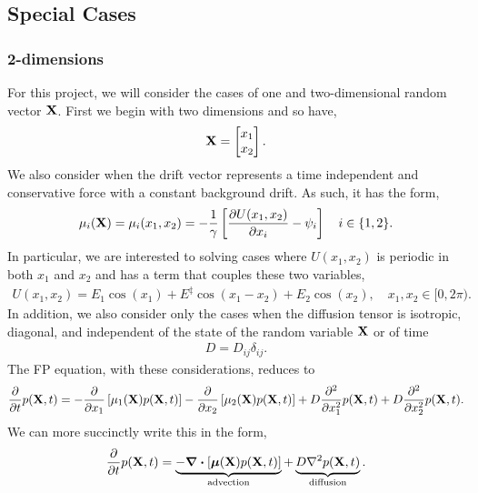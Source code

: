 \documentclass[12pt]{article}
\begin{document}
\subsection{Special Cases}

\subsubsection{2-dimensions}
For this project, we will consider the cases of one and two-dimensional random vector $\vb{X}$. First we begin with two dimensions and so have,
\begin{align}
    \vb{X} = 
    \begin{bmatrix}
        x_{1} \\ x_{2}
    \end{bmatrix}.
\end{align}
We also consider when the drift vector represents a time independent and conservative force with a constant background drift. As such, it has the form, 
\begin{align}
    \mu_{i}(\vb{X}) = \mu_{i}(x_{1},x_{2})= -\dfrac{1}{\gamma}\left[\pdv{U(x_{1},x_{2})}{x_{i}} - \psi_{i}\right]\quad i\in\{1,2\}.
\end{align}
In particular, we are interested to solving cases where $U(x_{1},x_{2})$ is periodic in both $x_{1}$ and $x_{2}$ and has a term that couples these two variables,
\begin{align}
    U(x_{1},x_{2}) = E_{1}\cos(x_{1}) + E^{\ddagger}\cos(x_{1}-x_{2}) + E_{2}\cos(x_{2}),\quad x_{1}, x_{2} \in [0,2\pi).
\end{align}
In addition, we also consider only the cases when the diffusion tensor is isotropic, diagonal, and independent of the state of the random variable $\vb{X}$ or of time 
\begin{align}
    D = D_{ij}\delta_{ij}.
\end{align}
The FP equation, with these considerations, reduces to 
\begin{align}
    \pdv{t}p(\vb{X},t) = -\pdv{x_{1}}\left[\mu_{1}(\vb{X})p(\vb{X},t)\right] - \pdv{x_{2}}\left[\mu_{2}(\vb{X})p(\vb{X},t)\right] +  
    D\pdv[2]{x_{1}}p(\vb{X},t)+  
    D\pdv[2]{x_{2}}p(\vb{X},t).
\end{align}
We can more succinctly write this in the form,
\begin{align}
    \pdv{t}p(\vb{X},t) = \underbrace{-\div{\left[\bm{\mu}(\vb{X})p(\vb{X},t)\right]}}_{\text{advection}} + \underbrace{D\laplacian{p(\vb{X},t)}}_{\text{diffusion}}.\label{eq:fpe_case}
\end{align}
\end{document}
